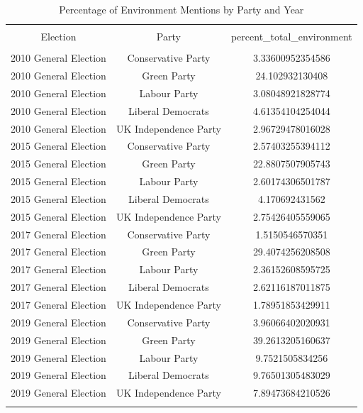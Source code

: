
\begin{table}[!htbp] \centering 
  \caption{Percentage of Environment Mentions by Party and Year} 
  \label{} 
\begin{tabular}{@{\extracolsep{5pt}} ccc} 
\\[-1.8ex]\hline 
\hline \\[-1.8ex] 
Election & Party & percent\_total\_environment \\ 
\hline \\[-1.8ex] 
 2010 General Election &  Conservative Party & 3.33600952354586 \\ 
 2010 General Election &  Green Party & 24.102932130408 \\ 
 2010 General Election &  Labour Party & 3.08048921828774 \\ 
 2010 General Election &  Liberal Democrats & 4.61354104254044 \\ 
 2010 General Election &  UK Independence Party & 2.96729478016028 \\ 
 2015 General Election &  Conservative Party & 2.57403255394112 \\ 
 2015 General Election &  Green Party & 22.8807507905743 \\ 
 2015 General Election &  Labour Party & 2.60174306501787 \\ 
 2015 General Election &  Liberal Democrats & 4.170692431562 \\ 
 2015 General Election &  UK Independence Party & 2.75426405559065 \\ 
 2017 General Election &  Conservative Party & 1.5150546570351 \\ 
 2017 General Election &  Green Party & 29.4074256208508 \\ 
 2017 General Election &  Labour Party & 2.36152608595725 \\ 
 2017 General Election &  Liberal Democrats & 2.62116187011875 \\ 
 2017 General Election &  UK Independence Party & 1.78951853429911 \\ 
 2019 General Election &  Conservative Party & 3.96066402020931 \\ 
 2019 General Election &  Green Party & 39.2613205160637 \\ 
 2019 General Election &  Labour Party & 9.7521505834256 \\ 
 2019 General Election &  Liberal Democrats & 9.76501305483029 \\ 
 2019 General Election &  UK Independence Party & 7.89473684210526 \\ 
\hline \\[-1.8ex] 
\end{tabular} 
\end{table} 
